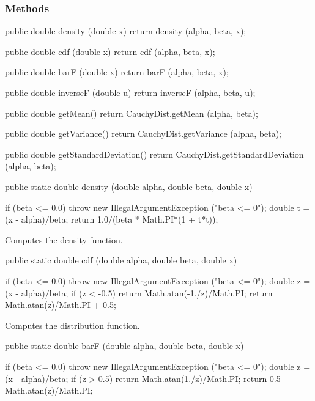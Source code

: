 \subsubsection* {Methods}
\begin{code}\begin{hide}

   public double density (double x) {
      return density (alpha, beta, x);
   }

   public double cdf (double x) {
      return cdf (alpha, beta, x);
   }

   public double barF (double x) {
      return barF (alpha, beta, x);
   }

   public double inverseF (double u){
      return inverseF (alpha, beta, u);
   }

   public double getMean() {
      return CauchyDist.getMean (alpha, beta);
   }

   public double getVariance() {
      return CauchyDist.getVariance (alpha, beta);
   }

   public double getStandardDeviation() {
      return CauchyDist.getStandardDeviation (alpha, beta);
   }\end{hide}

   public static double density (double alpha, double beta, double x)\begin{hide} {
      if (beta <= 0.0)
         throw new IllegalArgumentException ("beta <= 0");
      double t = (x - alpha)/beta;
      return 1.0/(beta * Math.PI*(1 + t*t));
   }\end{hide}
\end{code}
\begin{tabb} Computes the density function.
\end{tabb}
\begin{code}

   public static double cdf (double alpha, double beta, double x)\begin{hide} {
      if (beta <= 0.0)
         throw new IllegalArgumentException ("beta <= 0");
      double z = (x - alpha)/beta;
      if (z < -0.5)
         return Math.atan(-1./z)/Math.PI;
      return Math.atan(z)/Math.PI + 0.5;
   }\end{hide}
\end{code}
 \begin{tabb}
  Computes the  distribution function.
 \end{tabb}
\begin{code}

   public static double barF (double alpha, double beta, double x)\begin{hide} {
      if (beta <= 0.0)
         throw new IllegalArgumentException ("beta <= 0");
      double z = (x - alpha)/beta;
      if (z > 0.5)
         return Math.atan(1./z)/Math.PI;
      return 0.5 - Math.atan(z)/Math.PI;
   }\end{hide}
\end{code}
